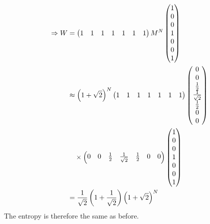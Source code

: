 \begin{align*}
    \Rightarrow W
    &= \begin{pmatrix}
        1 & 1 & 1 & 1 & 1 & 1 & 1
    \end{pmatrix}
    M^N \begin{pmatrix}
        1 \\ 0 \\ 0 \\ 1 \\ 0 \\ 0 \\ 1
    \end{pmatrix} \\
    &\approx {\left( 1 + \sqrt{2} \right)}^N
    \begin{pmatrix}
        1 & 1 & 1 & 1 & 1 & 1 & 1
    \end{pmatrix}
    \begin{pmatrix}
        0 \\ 0 \\ \frac{1}{2} \\ \frac{1}{\sqrt{2}} \\ \frac{1}{2} \\ 0 \\ 0
    \end{pmatrix} \\
    &\quad \times \begin{pmatrix}
        0 & 0 & \frac{1}{2} & \frac{1}{\sqrt{2}} & \frac{1}{2} & 0 & 0
    \end{pmatrix} \begin{pmatrix}
        1 \\ 0 \\ 0 \\ 1 \\ 0 \\ 0 \\ 1
    \end{pmatrix} \\
    &= \frac{1}{\sqrt{2}} \left( 1 + \frac{1}{\sqrt{2}} \right) {\left( 1 + \sqrt{2} \right)}^N
\end{align*}
The entropy is therefore the same as before.
